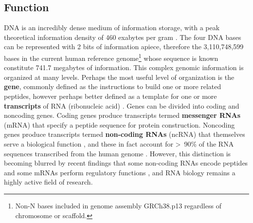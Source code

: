 \subsection{Function}
\label{ssec:intro:dna_function}
DNA is an incredibly dense medium of information storage, with a peak theoretical information density of 460 exabytes per gram \cite{dong2020}. The four DNA bases can be represented with 2 bits of information apiece, therefore the 3,110,748,599 bases in the current human reference genome\footnote{Non-N bases included in genome assembly GRCh38.p13 regardless of chromosome or scaffold.} \cite{lander2001} whose sequence is known constitute \textapprox{}741.7 megabytes of information. This complex genomic information is organized at many levels. Perhaps the most useful level of organization is the \textbf{gene}, commonly defined as the instructions to build one or more related peptides, however perhaps better defined as a template for one or more \textbf{transcripts} of RNA (ribonucleic acid) \cite{pearson2006}. Genes can be divided into coding and noncoding genes. Coding genes produce transcripts termed \textbf{messenger RNAs} (mRNA) that specify a peptide sequence for protein construction. Noncoding genes produce transcripts termed \textbf{non-coding RNAs} (ncRNA) that themselves serve a biological function \cite{esteller2011}, and these in fact account for \textgreater{}~90\% of the RNA sequences transcribed from the human genome \cite{slack2019}. However, this distinction is becoming blurred by recent findings that some non-coding RNAs encode peptides and some mRNAs perform regulatory functions \cite{li2019}, and RNA biology remains a highly active field of research.


